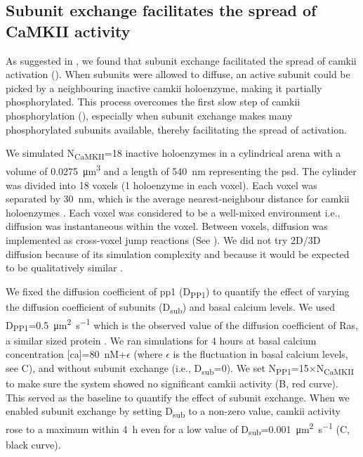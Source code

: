 \documentclass[9pt,lineno,doublespacing]{elife}
\newcommand\SUB[2]{#1\textsubscript{#2}}
\begin{document}
\subsection{Subunit exchange facilitates the spread of CaMKII activity}
\label{res:spread_activity}

As suggested in \cite{stratton_activation-triggered_2014}, we found that
subunit exchange facilitated the spread of \gls{camkii} activation
(). When subunits were allowed to diffuse, an
active subunit could be picked by a neighbouring inactive \gls{camkii}
holoenzyme, making it partially phosphorylated. This process overcomes the first
slow step of \gls{camkii} phosphorylation (), especially when
subunit exchange makes many phosphorylated subunits available, thereby
facilitating the spread of activation.

We simulated \SUB{N}{CaMKII}=18 inactive holoenzymes in a cylindrical arena
with a volume of \SI{0.0275}{\cubic\micro\meter} and a length of
\SI{540}{\nano\meter} representing the \gls{psd}. The cylinder was divided into
18 voxels (1 holoenzyme in each voxel). Each voxel was separated by
\SI{30}{\nano\meter}, which is the average nearest-neighbour distance for
\gls{camkii} holoenzymes \citep{feng_quantitative_2011}. Each voxel was
considered to be a well-mixed environment i.e., diffusion was
instantaneous within the voxel. Between voxels, diffusion was implemented as
cross-voxel jump reactions (See ). We did
not try 2D/3D diffusion because of its simulation complexity and because it
would be expected to be qualitatively similar \citep{fange_stochastic_2010}.

We fixed the diffusion coefficient of \gls{pp1} (\SUB{D}{PP1}) to quantify the
effect of varying the diffusion coefficient of subunits (\SUB{D}{sub}) and basal
calcium levels. We used \SUB{D}{PP1}=\SI{0.5}{\micro\meter\squared\per\second}
which is the observed value of the diffusion coefficient of Ras, a similar sized
protein \citep{harvey_spread_2008}. We ran simulations for 4 hours at basal
calcium concentration [\gls{ca}]=\SI{80}{\nano M}+$\epsilon$ (where $\epsilon$
is the fluctuation in basal calcium levels, see C), and without
subunit exchange (i.e., \SUB{D}{sub}=0). We set
\SUB{N}{PP1}=15$\times$\SUB{N}{CaMKII} to make sure the system showed no
significant \gls{camkii} activity (B, red
curve). This served as the baseline to quantify the effect of subunit exchange.
When we enabled subunit exchange by setting \SUB{D}{sub} to a non-zero value,
\gls{camkii} activity rose to a maximum within \SI{4}{\hour} even for a low
value of \SUB{D}{sub}=\SI{0.001}{\micro\meter\squared\per\second}
(C, black curve).
\end{document}
